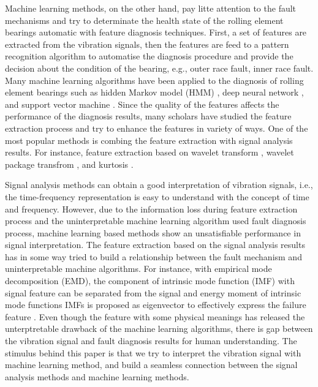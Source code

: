 \documentclass[journal]{IEEEtran}
\theoremstyle{definition}
\begin{document}
 
Machine learning methods, on the other hand, pay litte attention to the fault mechanisms and try to determinate the health state of the rolling element bearings automatic with feature diagnosis techniques. First, a set of features  are extracted from the vibration signals, then the features are feed to a pattern recognition algorithm to automatise the diagnosis procedure and provide the decision about the condition of the bearing, e.g., outer race fault, inner race fault. Many machine learning algorithms have been applied to the diagnosis of rolling element bearings such as hidden Markov model (HMM) \cite{jiang2015study,purushotham2005multi,jiang2016hidden,jiang2017intelligent}, deep neural network \cite{guo2016hierarchical,gan2016construction}, and support vector machine \cite{chen2015novel,abbasion2007rolling,widodo2007support}. Since the quality of the features affects the performance of the diagnosis results, many scholars have studied the feature extraction process and try to enhance the features in variety of ways. One of the most popular methods is combing the feature extraction with signal analysis results. For instance, feature extraction based on wavelet transform \cite{he2015automatic,zhang2015rolling}, wavelet package transfrom \cite{wang2018fault}, and kurtosis \cite{tian2016motor}.

Signal analysis methods can obtain a good interpretation of vibration signals, i.e., the time-frequency representation  is easy to understand with the concept of time and frequency. However, due to the information loss during feature extraction process and the uninterpretable machine learning algorithm used fault diagnosis process, machine learning based methods show an unsatisfiable performance in signal interpretation. The feature extraction based on the signal analysis results has in some way tried to build a relationship between the fault mechanism and uninterpretable machine algorithms. For instance, with empirical mode decomposition (EMD), the component of intrinsic mode function (IMF) with signal feature can be separated from the signal and  energy moment of  intrinsic mode functions IMFs is proposed as eigenvector to effectively express the failure feature \cite{bin2012early}. Even though the feature with some physical meanings has released the unterptretable drawback of the machine learning algorithms, there is gap between the vibration signal and fault diagnosis  results for human understanding. The stimulus behind this paper is that we try to interpret the vibration signal with machine learning method, and build a seamless connection between the signal analysis methods and machine learning methods. 
\end{document}

